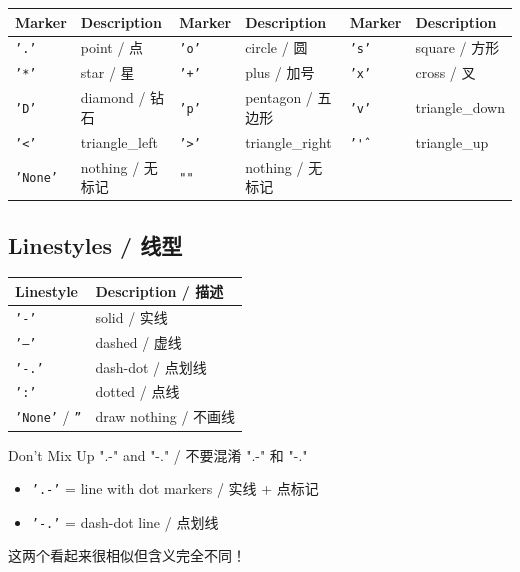 \documentclass[11pt,a4paper]{report}
\let\oldtexttt\texttt
\renewcommand{\texttt}[1]{\textcolor{mainblue}{\oldtexttt{#1}}}
\begin{document}
\medskip
\centering
\small
\renewcommand{\arraystretch}{1.2}
\begin{tabular}{@{}llllll@{}}
\toprule
\textbf{Marker} & \textbf{Description} & \textbf{Marker} & \textbf{Description} & \textbf{Marker} & \textbf{Description} \\ \midrule
\texttt{'.'} & point / 点 & \texttt{'o'} & circle / 圆 & \texttt{'s'} & square / 方形 \\
\texttt{'*'} & star / 星 & \texttt{'+'} & plus / 加号 & \texttt{'x'} & cross / 叉 \\
\texttt{'D'} & diamond / 钻石 & \texttt{'p'} & pentagon / 五边形 & \texttt{'v'} & triangle\_down \\
\texttt{'<'} & triangle\_left & \texttt{'>'} & triangle\_right & \texttt{'\^'} & triangle\_up \\
\texttt{'None'} & nothing / 无标记 & \texttt{""} & nothing / 无标记 & & \\ \bottomrule
\end{tabular}
\medskip

\subsection{Linestyles / 线型}

\medskip
\centering
\renewcommand{\arraystretch}{1.3}
\begin{tabular}{@{}ll@{}}
\toprule
\textbf{Linestyle} & \textbf{Description / 描述} \\ \midrule
\texttt{'-'}  & solid / 实线 \\
\texttt{'--'} & dashed / 虚线 \\
\texttt{'-.'} & dash-dot / 点划线 \\
\texttt{':'}  & dotted / 点线 \\
\texttt{'None'} / \texttt{''} & draw nothing / 不画线 \\ \bottomrule
\end{tabular}
\medskip

\begin{warning}{Don't Mix Up ".-" and "-." / 不要混淆 ".-" 和 "-."}
    \begin{itemize}
        \item \texttt{'.-'} = line with dot markers / 实线 + 点标记
        \item \texttt{'-.'} = dash-dot line / 点划线
    \end{itemize}
    这两个看起来很相似但含义完全不同！
\end{warning}
\end{document}
